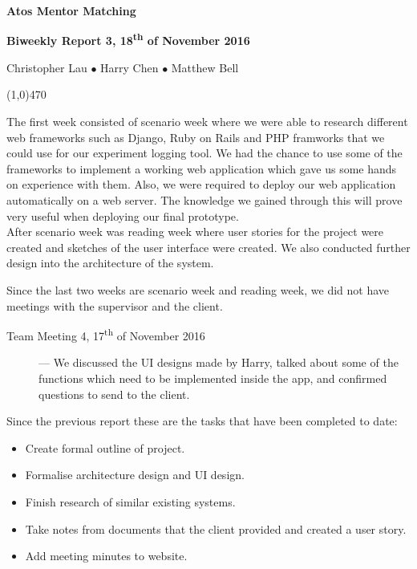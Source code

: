 \documentclass[11pt]{report}
\begin{document}
\centerline{{\LARGE \bf Atos Mentor Matching}}

\centerline{ \large \bf Biweekly Report 3, 18\textsuperscript{th} of November 2016}
\centerline{ Christopher Lau $\bullet$ Harry Chen $\bullet$ Matthew Bell }
\noindent
\line(1,0){470}\\


\smallskip

\noindent
The first week consisted of scenario week where we were able to research different web frameworks such as Django, Ruby on Rails and PHP framworks that we could use for our experiment logging tool. We had the chance to use some of the frameworks to implement a working web application which gave us some hands on experience with them. Also, we were required to deploy our web application automatically on a web server. The knowledge we gained through this will prove very useful when deploying our final prototype.\\

\noindent
After scenario week was reading week where user stories for the project were created and sketches of the user interface were created. We also conducted further design into the architecture of the system.\\

\bigskip
{}
\smallskip

\noindent
Since the last two weeks are scenario week and reading week, we did not have meetings with the supervisor and the client.\\

\begin{description}
  \item[Team Meeting 4, 17\textsuperscript{th} of November 2016] --- We discussed the UI designs made by Harry, talked about some of the functions which need to be implemented inside the app, and confirmed questions to send to the client.
\end{description}

\bigskip
{}
\smallskip

\noindent
Since the previous report these are the tasks that have been completed to date:
\begin{itemize}
  \item Create formal outline of project.
  \item Formalise architecture design and UI design.
  \item Finish research of similar existing systems.
  \item Take notes from documents that the client provided and created a user story.
  \item Add meeting minutes to website.
\end{itemize}
\end{document}
